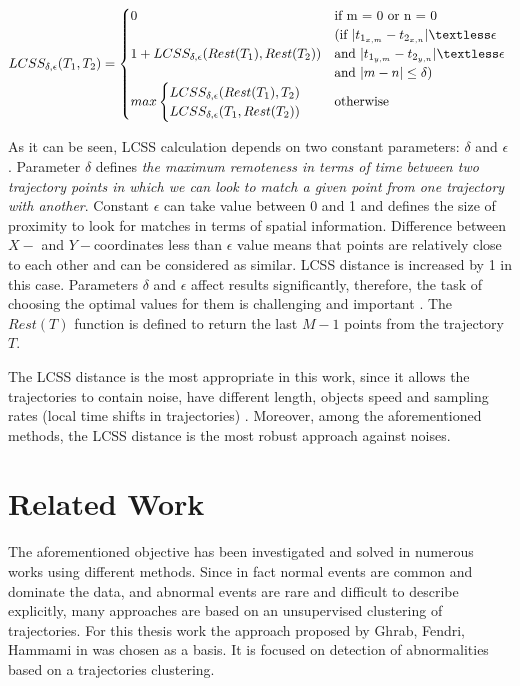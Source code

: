 \begin{equation} \label{eq:lcss}
	LCSS_{\delta, \epsilon}(T_1, T_2) = 
		\begin{cases}
			0 			&\text{if m = 0 or n = 0}\\
						&\text{(if $|t_{1_{x,m}} - t_{2_{x,n}}| \textless \epsilon$}\\
			1 + LCSS_{\delta, \epsilon}(Rest(T_1), Rest(T_2)) 
						&\text{and $|t_{1_{y,m}} - t_{2_{y,n}}| \textless \epsilon$ }\\
						&\text{and $|m - n| \le \delta$)}\\
			max
			\begin{cases}
				LCSS_{\delta, \epsilon}(Rest(T_1), T_2)\\
				LCSS_{\delta, \epsilon}(T_1, Rest(T_2))
			\end{cases} &\text{otherwise}
		\end{cases}
\end{equation}

As it can be seen, LCSS calculation depends on two constant parameters: $\delta$ and $\epsilon$. Parameter $\delta$ defines \textit{the maximum remoteness in terms of time between two trajectory points in which we can look to match a given point from one trajectory with another}. Constant $\epsilon$ can take value between 0 and 1 and defines the size of proximity to look for matches in terms of spatial information. Difference between $X-$ and $Y-$coordinates less than $\epsilon$ value means that points are relatively close to each other and can be considered as similar. LCSS distance is increased by 1 in this case. Parameters $\delta$ and $\epsilon$ affect results significantly, therefore, the task of choosing the optimal values for them is challenging and important \cite{inproceedings:7_related_work}\cite{inproceedings:28_lcss_dsmt}. The $Rest(T)$ function is defined to return the last $M - 1$ points from the trajectory $T$.

The LCSS distance is the most appropriate in this work, since it allows the trajectories to contain noise, have different length, objects speed and sampling rates (local time shifts in trajectories) \cite{inproceedings:7_related_work}. Moreover, among the aforementioned methods, the LCSS distance is the most robust approach against noises.


\section{Related Work}
The aforementioned objective has been investigated and solved in numerous works using different methods. Since in fact normal events are common and dominate the data, and abnormal events are rare and difficult to describe explicitly, many approaches are based on an unsupervised clustering of trajectories. For this thesis work the approach proposed by Ghrab, Fendri, Hammami in \cite{inproceedings:7_related_work} was chosen as a basis. It is focused on detection of abnormalities based on a trajectories clustering.


